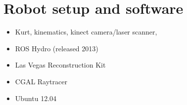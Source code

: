 \documentclass[Thesis.tex]{subfiles}
\begin{document}
\chapter{Robot setup and software}

\begin{itemize}
	\item Kurt, kinematics, kinect camera/laser scanner,
  \item ROS Hydro (released 2013)
  \item Las Vegas Reconstruction Kit
  \item CGAL Raytracer
  \item Ubuntu 12.04 
\end{itemize}
\end{document}
